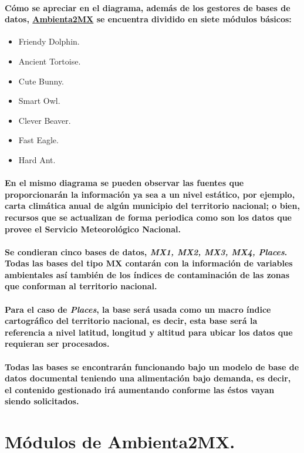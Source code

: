     \paragraph{Cómo se apreciar en el diagrama, además de los gestores de bases de datos, \underline{Ambienta2MX} se encuentra dividido en siete módulos básicos:}
    \begin{itemize}
		\item Friendy Dolphin.
		\item Ancient Tortoise.
		\item Cute Bunny.
		\item Smart Owl.
		\item Clever Beaver.
		\item Fast Eagle.
		\item Hard Ant.
	\end{itemize}
    \paragraph{En el mismo diagrama se pueden observar las fuentes que proporcionarán la información ya sea a un nivel estático, por ejemplo, carta climática anual de algún municipio del territorio nacional; o bien, recursos que se actualizan de forma periodica como son los datos que provee el Servicio Meteorológico Nacional.}
    \paragraph{Se condieran cinco bases de datos, \emph{MX1, MX2, MX3, MX4, Places}. Todas las bases del tipo MX contarán con la información de variables ambientales así también de los índices de contaminación de las zonas que conforman al territorio nacional.}
    \paragraph{Para el caso de \emph{Places}, la base será usada como un macro índice cartográfico del territorio nacional, es decir, esta base será la referencia a nivel latitud, longitud y altitud para ubicar los datos que requieran ser procesados.}
    \paragraph{Todas las bases se encontrarán funcionando bajo un modelo de base de datos documental teniendo una alimentación bajo demanda, es decir, el contenido gestionado irá aumentando conforme las éstos vayan siendo solicitados.}
    \section{Módulos de Ambienta2MX.}
